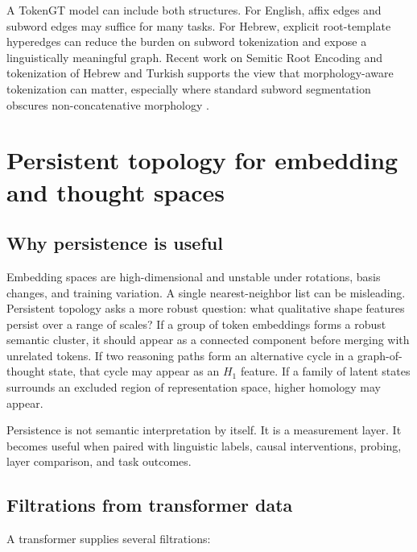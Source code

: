 \documentclass[11pt]{article}
\newcommand{\1}{\mathbf{1}}
\begin{document}
A TokenGT model can include both structures. For English, affix edges and subword edges may suffice for many tasks. For Hebrew, explicit root-template hyperedges can reduce the burden on subword tokenization and expose a linguistically meaningful graph. Recent work on Semitic Root Encoding and tokenization of Hebrew and Turkish supports the view that morphology-aware tokenization can matter, especially where standard subword segmentation obscures non-concatenative morphology \cite{Hatch2025,Samo2026}.

\section{Persistent topology for embedding and thought spaces}

\subsection{Why persistence is useful}

Embedding spaces are high-dimensional and unstable under rotations, basis changes, and training variation. A single nearest-neighbor list can be misleading. Persistent topology asks a more robust question: what qualitative shape features persist over a range of scales? If a group of token embeddings forms a robust semantic cluster, it should appear as a connected component before merging with unrelated tokens. If two reasoning paths form an alternative cycle in a graph-of-thought state, that cycle may appear as an $H_1$ feature. If a family of latent states surrounds an excluded region of representation space, higher homology may appear.

Persistence is not semantic interpretation by itself. It is a measurement layer. It becomes useful when paired with linguistic labels, causal interventions, probing, layer comparison, and task outcomes.

\subsection{Filtrations from transformer data}

A transformer supplies several filtrations:
\end{document}
